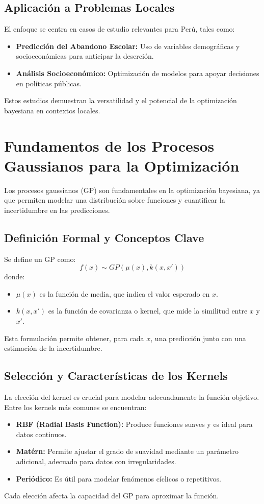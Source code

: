 \documentclass[12pt]{article}
\begin{document}
	\subsection{Aplicación a Problemas Locales}
	El enfoque se centra en casos de estudio relevantes para Perú, tales como:
	\begin{itemize}[leftmargin=1.5cm]
		\item \textbf{Predicción del Abandono Escolar:} Uso de variables demográficas y socioeconómicas para anticipar la deserción.
		\item \textbf{Análisis Socioeconómico:} Optimización de modelos para apoyar decisiones en políticas públicas.
	\end{itemize}
	Estos estudios demuestran la versatilidad y el potencial de la optimización bayesiana en contextos locales.  
	\lipsum[10]
	
	\section{Fundamentos de los Procesos Gaussianos para la Optimización}
	Los procesos gaussianos (GP) son fundamentales en la optimización bayesiana, ya que permiten modelar una distribución sobre funciones y cuantificar la incertidumbre en las predicciones.
	
	\subsection{Definición Formal y Conceptos Clave}
	Se define un GP como:
	\[
	f(x) \sim GP(\mu(x), k(x,x'))
	\]
	donde:
	\begin{itemize}[leftmargin=1.5cm]
		\item \(\mu(x)\) es la función de media, que indica el valor esperado en \(x\).
		\item \(k(x,x')\) es la función de covarianza o kernel, que mide la similitud entre \(x\) y \(x'\).
	\end{itemize}
	Esta formulación permite obtener, para cada \(x\), una predicción junto con una estimación de la incertidumbre.  
	\lipsum[11]
	
	\subsection{Selección y Características de los Kernels}
	La elección del kernel es crucial para modelar adecuadamente la función objetivo. Entre los kernels más comunes se encuentran:
	\begin{itemize}[leftmargin=1.5cm]
		\item \textbf{RBF (Radial Basis Function):} Produce funciones suaves y es ideal para datos continuos.
		\item \textbf{Matérn:} Permite ajustar el grado de suavidad mediante un parámetro adicional, adecuado para datos con irregularidades.
		\item \textbf{Periódico:} Es útil para modelar fenómenos cíclicos o repetitivos.
	\end{itemize}
	Cada elección afecta la capacidad del GP para aproximar la función.  
	\lipsum[12]
	
\end{document}
